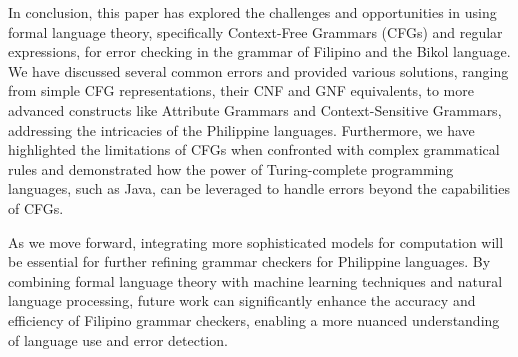 In conclusion, this paper has explored the challenges and opportunities in using formal language theory, specifically Context-Free Grammars (CFGs) and regular expressions, for error checking in the grammar of Filipino and the Bikol language. We have discussed several common errors and provided various solutions, ranging from simple CFG representations, their CNF and GNF equivalents, to more advanced constructs like Attribute Grammars and Context-Sensitive Grammars, addressing the intricacies of the Philippine languages. Furthermore, we have highlighted the limitations of CFGs when confronted with complex grammatical rules and demonstrated how the power of Turing-complete programming languages, such as Java, can be leveraged to handle errors beyond the capabilities of CFGs.

As we move forward, integrating more sophisticated models for computation will be essential for further refining grammar checkers for Philippine languages. By combining formal language theory with machine learning techniques and natural language processing, future work can significantly enhance the accuracy and efficiency of Filipino grammar checkers, enabling a more nuanced understanding of language use and error detection.